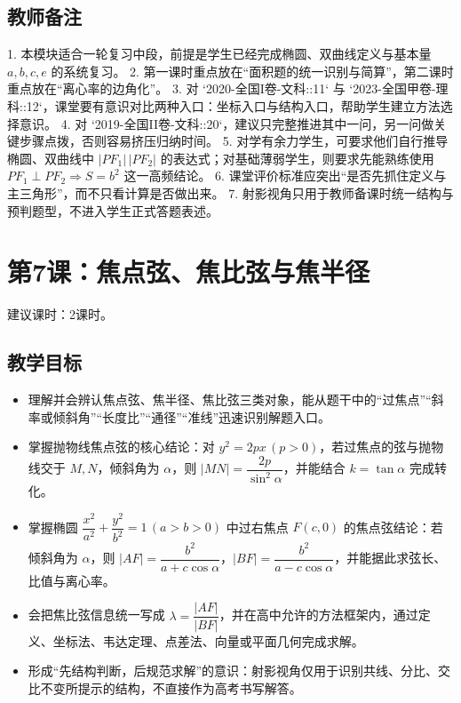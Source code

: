 \documentclass[UTF8,a4paper,11pt]{ctexart}
\begin{document}
\subsection*{教师备注}

1. 本模块适合一轮复习中段，前提是学生已经完成椭圆、双曲线定义与基本量 $a,b,c,e$ 的系统复习。
2. 第一课时重点放在“面积题的统一识别与简算”，第二课时重点放在“离心率的边角化”。
3. 对 `2020-全国I卷-文科::11` 与 `2023-全国甲卷-理科::12`，课堂要有意识对比两种入口：坐标入口与结构入口，帮助学生建立方法选择意识。
4. 对 `2019-全国II卷-文科::20`，建议只完整推进其中一问，另一问做关键步骤点拨，否则容易挤压归纳时间。
5. 对学有余力学生，可要求他们自行推导椭圆、双曲线中 $|PF_1|\,|PF_2|$ 的表达式；对基础薄弱学生，则要求先能熟练使用 $PF_1\perp PF_2\Rightarrow S=b^2$ 这一高频结论。
6. 课堂评价标准应突出“是否先抓住定义与主三角形”，而不只看计算是否做出来。
7. 射影视角只用于教师备课时统一结构与预判题型，不进入学生正式答题表述。

\clearpage

\section{第7课：焦点弦、焦比弦与焦半径}

\noindent 建议课时：2课时。

\subsection*{教学目标}

\begin{itemize}

\item 理解并会辨认焦点弦、焦半径、焦比弦三类对象，能从题干中的“过焦点”“斜率或倾斜角”“长度比”“通径”“准线”迅速识别解题入口。

\item 掌握抛物线焦点弦的核心结论：对 $y^2=2px\,(p>0)$，若过焦点的弦与抛物线交于 $M,N$，倾斜角为 $\alpha$，则 $|MN|=\dfrac{2p}{\sin^2\alpha}$，并能结合 $k=\tan\alpha$ 完成转化。

\item 掌握椭圆 $\dfrac{x^2}{a^2}+\dfrac{y^2}{b^2}=1\,(a>b>0)$ 中过右焦点 $F(c,0)$ 的焦点弦结论：若倾斜角为 $\alpha$，则 $|AF|=\dfrac{b^2}{a+c\cos\alpha}$，$|BF|=\dfrac{b^2}{a-c\cos\alpha}$，并能据此求弦长、比值与离心率。

\item 会把焦比弦信息统一写成 $\lambda=\dfrac{|AF|}{|BF|}$，并在高中允许的方法框架内，通过定义、坐标法、韦达定理、点差法、向量或平面几何完成求解。

\item 形成“先结构判断，后规范求解”的意识：射影视角仅用于识别共线、分比、交比不变所提示的结构，不直接作为高考书写解答。

\end{itemize}
\end{document}
